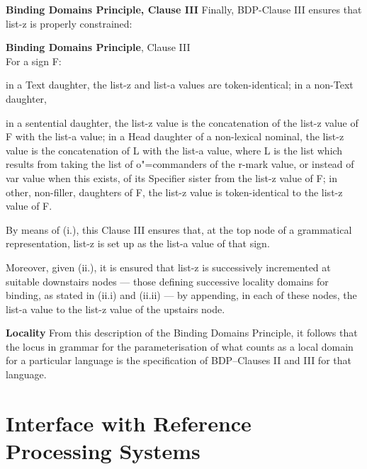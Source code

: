 \documentclass[output=paper
,modfonts
,nonflat]{langsci/langscibook}
\begin{document}
\pagebreak
\textbf{Binding Domains Principle, Clause III}  Finally, BDP-Clause III ensures that {\sc list-z} is properly
constrained:

\begin{samepage}
\begin{exe}
\ex
\textbf{Binding Domains Principle}, Clause III\\
For a sign F:
\begin{xlisti}
\ex	in a Text daughter, the {\sc list-z} and {\sc list-a} values are token-identical;
\ex	in a non-Text daughter,
\begin{xlisti} 
\ex in a sentential daughter, the {\sc list-z} value is the concatenation of the {\sc
list-z} value of F with the {\sc list-a} value; 
\ex in a Head daughter of a non-lexical nominal, the {\sc list-z} value is the concatenation of L
with the {\sc list-a} value, where L is the list which results from taking the list of
o"=commanders of the {\sc r-mark} value, or instead of {\sc var} value when this exists,
of its Specifier sister from the {\sc list-z} value of F;
\ex in other, non-filler, daughters of F, the {\sc list-z} value is token-iden\-ti\-cal to
the {\sc list-z} value of F.
\end{xlisti}
\end{xlisti}

\end{exe}
\end{samepage}

By means of (i.), this Clause III ensures that, at the top
node of a grammatical representation, {\sc list-z} is set up as the
{\sc list-a} value of that sign. 

Moreover, given (ii.), it is ensured that {\sc list-z} is successively
incremented at suitable downstairs nodes --- those defining
successive locality domains for binding, as stated in (ii.i) and
(ii.ii) --- by appending, 
in each of these nodes, the {\sc list-a} value to the {\sc list-z} value
of the upstairs node.

\textbf{Locality} From this description of the Binding Domains Principle, it follows 
that the locus in grammar for the parameterisation 
of what counts as a local domain for a particular language is 
the specification of BDP--Clauses II and III for that language.



\section{Interface with Reference Processing Systems \label{discuss}}
\end{document}
